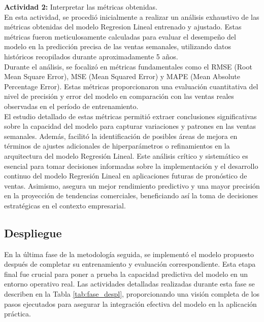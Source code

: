 		
		\textbf{Actividad 2: } Interpretar las métricas obtenidas.\\
		En esta actividad, se procedió inicialmente a realizar un análisis exhaustivo de las métricas obtenidas del modelo Regresion Lineal entrenado y ajustado. Estas métricas fueron meticulosamente calculadas para evaluar el desempeño del modelo en la predicción precisa de las ventas semanales, utilizando datos históricos recopilados durante aproximadamente 5 años.\\
		Durante el análisis, se focalizó en métricas fundamentales como el RMSE (Root Mean Square Error), MSE (Mean Squared Error) y MAPE (Mean Absolute Percentage Error). Estas métricas proporcionaron una evaluación cuantitativa del nivel de precisión y error del modelo en comparación con las ventas reales observadas en el período de entrenamiento.\\
		El estudio detallado de estas métricas permitió extraer conclusiones significativas sobre la capacidad del modelo para capturar variaciones y patrones en las ventas semanales. Además, facilitó la identificación de posibles áreas de mejora en términos de ajustes adicionales de hiperparámetros o refinamientos en la arquitectura del modelo Regresión Lineal.
		Este análisis crítico y sistemático es esencial para tomar decisiones informadas sobre la implementación y el desarrollo continuo del modelo Regresión Lineal en aplicaciones futuras de pronóstico de ventas. Asimismo, asegura un mejor rendimiento predictivo y una mayor precisión en la proyección de tendencias comerciales, beneficiando así la toma de decisiones estratégicas en el contexto empresarial.\\
		
		
		\subsection{Despliegue}
		En la última fase de la metodología seguida, se implementó el modelo propuesto después de completar su entrenamiento y evaluación correspondiente. Esta etapa final fue crucial para poner a prueba la capacidad predictiva del modelo en un entorno operativo real. Las actividades detalladas realizadas durante esta fase se describen en la Tabla \ref{tab:fase_despl}, proporcionando una visión completa de los pasos ejecutados para asegurar la integración efectiva del modelo en la aplicación práctica.
		

